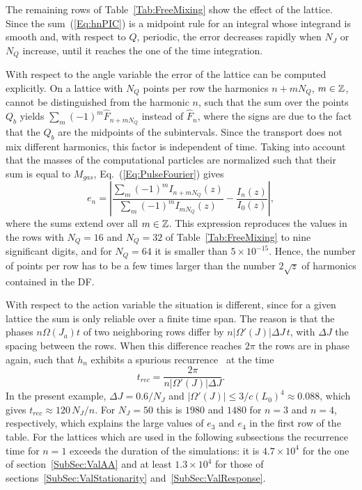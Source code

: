 The remaining rows of Table~\ref{Tab:FreeMixing} show the effect of the lattice. Since the sum~(\ref{Eq:hnPIC}) is a midpoint rule for an integral whose integrand is smooth and, with respect to $Q$, periodic, the error decreases rapidly when $N_J$ or $N_Q$ increase, until it reaches the one of the time integration.

With respect to the angle variable the error of the lattice can be computed explicitly. On a lattice with $N_Q$ points per row the harmonics $n + mN_Q$, $m\in\mathbb{Z}$, cannot be distinguished from the harmonic $n$, such that the sum over the points $Q_b$ yields $\sum_m (-1)^m\hat{F}_{n+mN_Q}$ instead of $\hat{F}_n$, where the signs are due to the fact that the $Q_b$ are the midpoints of the subintervals. Since the transport does not mix different harmonics, this factor is independent of time. Taking into account that the masses of the computational particles are normalized such that their sum is equal to $M_{gas}$, Eq.~(\ref{Eq:PulseFourier}) gives
\begin{equation}
e_n = \left| \frac{\sum_m (-1)^m I_{n+mN_Q}(z)}{\sum_m (-1)^m I_{mN_Q}(z)} - \frac{I_n(z)}{I_0(z)} \right| ,
\label{Eq:Aliasing}
\end{equation}
where the sums extend over all $m\in\mathbb{Z}$. This expression reproduces the values in the rows with $N_Q = 16$ and $N_Q = 32$ of Table~\ref{Tab:FreeMixing} to nine significant digits, and for $N_Q = 64$ it is smaller than $5\times 10^{-15}$. Hence, the number of points per row has to be a few times larger than the number $2\sqrt{z}$ of harmonics contained in the DF.

With respect to the action variable the situation is different, since for a given lattice the sum is only reliable over a finite time span. The reason is that the phases $n\Omega(J_a)t$ of two neighboring rows differ by $n|\Omega'(J)|\Delta J\, t$, with $\Delta J$ the spacing between the rows. When this difference reaches $2\pi$ the rows are in phase again, such that $h_n$ exhibits a spurious recurrence~\cite{BirdsallLangdon-Book} at the time
\begin{equation}
t_{rec} = \frac{2\pi}{n|\Omega'(J)|\Delta J}.
\label{Eq:Recurrence}
\end{equation}
In the present example, $\Delta J = 0.6/N_J$ and $|\Omega'(J)|\leq 3/c(L_0)^4\approx 0.088$, which gives $t_{rec}\approx 120\, N_J/n$. For $N_J = 50$ this is $1980$ and $1480$ for $n = 3$ and $n = 4$, respectively, which explains the large values of $e_3$ and $e_4$ in the first row of the table. For the lattices which are used in the following subsections the recurrence time for $n = 1$ exceeds the duration of the simulations: it is $4.7\times 10^4$ for the one of section~\ref{SubSec:ValAA} and at least $1.3\times 10^4$ for those of sections~\ref{SubSec:ValStationarity} and~\ref{SubSec:ValResponse}.

